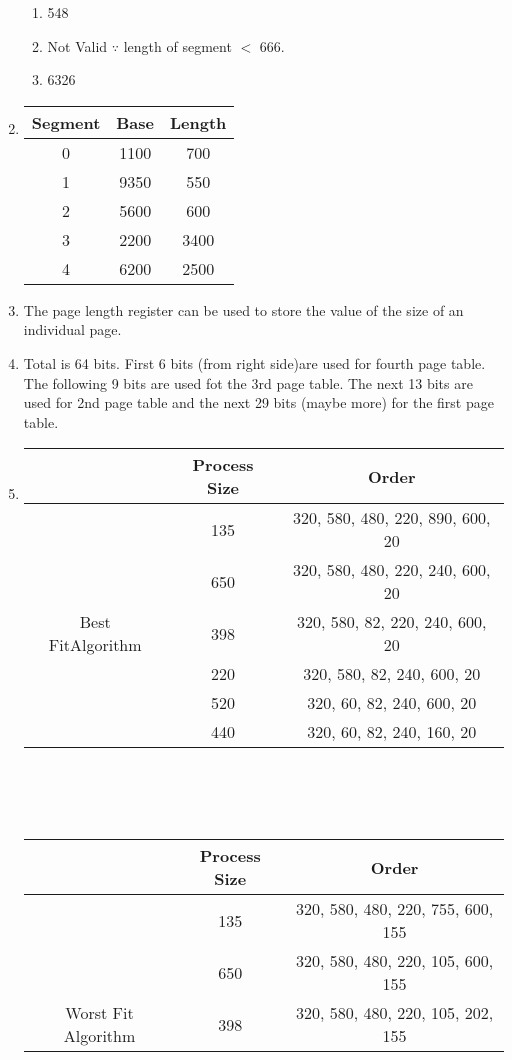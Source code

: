 \documentclass[a4paper,12pt]{report}
\begin{document}
\begin{enumerate}
\begin{enumerate}
\item 548
\item Not Valid $\because$ length of segment $<$ 666.
\item 6326
\end{enumerate}
\item
\begin{tabular}{|c|c|c|}
\hline
Segment & Base & Length \\ \hline
0 & 1100 & 700 \\ \hline
1 & 9350 & 550 \\ \hline
2 & 5600 & 600 \\ \hline
3 & 2200 & 3400 \\ \hline
4 & 6200 & 2500 \\ \hline
\end{tabular}
\item The page length register can be used to store the value of the size of an individual page.
\item
Total is 64 bits. First 6 bits (from right side)are used for fourth page table. The following 9 bits are used fot the 3rd page table. The next 13 bits are used for 2nd page table and the next 29 bits (maybe more) for the first page table.
\item
\begin{tabular}{|c|c|c|}
\hline
& Process Size & Order \\ \hline
 & 135 & 320, 580, 480, 220, 890, 600, 20 \\ \cline{2-3} 
 & 650 & 320, 580, 480, 220, 240, 600, 20 \\ \cline{2-3} 
Best FitAlgorithm & 398 & 320, 580, 82, 220, 240, 600, 20 \\ \cline{2-3} 
 & 220 & 320, 580, 82, 240, 600, 20 \\ \cline{2-3} 
 & 520 & 320, 60, 82, 240, 600, 20 \\ \cline{2-3}
 & 440 & 320, 60, 82, 240, 160, 20 \\ \hline
\end{tabular}\\\\\\
 \begin{tabular}{|c|c|c|}
 \hline
  & Process Size & Order \\ \hline
 & 135 & 320, 580, 480, 220, 755, 600, 155 \\ \cline{2-3} 
 & 650 & 320, 580, 480, 220, 105, 600, 155 \\ \cline{2-3}
Worst Fit Algorithm & 398 & 320, 580, 480, 220, 105, 202, 155 \\ \cline{2-3} 

\end{tabular}
\end{enumerate}
\end{document}
